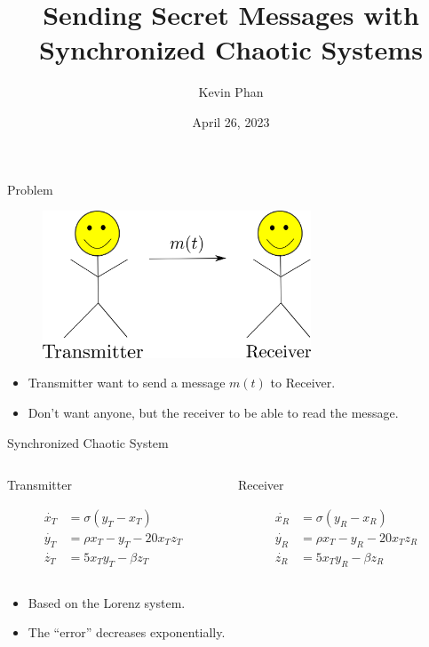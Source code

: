 \documentclass{beamer}
\title[Synchronized Chaos]{Sending Secret Messages with Synchronized
Chaotic Systems}
\author{Kevin Phan}
\institute{Harvey Mudd College}
\date{April 26, 2023}
\begin{document}
\frame{\titlepage}

\begin{frame}{Problem}
    \begin{figure}[H]
        \includegraphics[width=8cm]{drawing.png}
        \centering
    \end{figure}
    \begin{itemize}
        \item Transmitter want to send a message $m(t)$ to Receiver. 
        \item Don't want anyone, but the receiver to be able to read the message.
    \end{itemize}
\end{frame}

\begin{frame}{Synchronized Chaotic System}
    \begin{columns}
        \begin{column}{0.5\textwidth}
           \begin{center}
            Transmitter 
           \end{center} 
           \begin{align*}
                \dot{x_T} &= \sigma (y_T - x_T) \\
                \dot{y_T} &= \rho x_T - y_T - 20x_T z_T \\
                \dot{z_T} &= 5x_T y_T - \beta z_T 
           \end{align*}
        \end{column}
        \begin{column}{0.5\textwidth}  
            \begin{center}
                Receiver 
            \end{center} 
            \begin{align*}
                \dot{x_R} &= \sigma (y_R - x_R) \\
                \dot{y_R} &= \rho x_T - y_R - 20x_T z_R \\
                \dot{z_R} &= 5x_T y_R - \beta z_R
            \end{align*}
        \end{column}
        \end{columns} 
         \bigskip
        \begin{itemize}
            \item Based on the Lorenz system. 
            \item The ``error'' decreases exponentially. 
        \end{itemize}
\end{frame}
\end{document}
